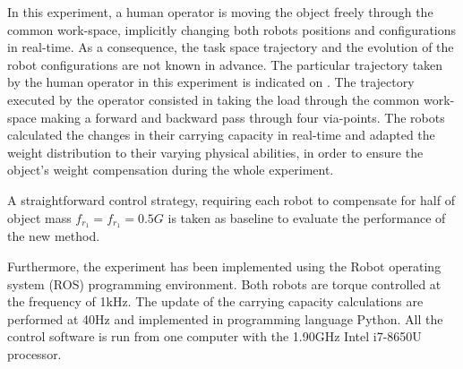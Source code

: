 In this experiment, a human operator is moving the object freely through the common work-space, implicitly changing both robots positions and configurations in real-time. As a consequence, the task space trajectory and the evolution of the robot configurations are not known in advance. The particular trajectory taken by the human operator in this experiment is indicated on . 
The trajectory executed by the operator consisted in taking the load through the common work-space making a forward and backward pass through four via-points. The robots calculated the changes in their carrying capacity in real-time and adapted the weight distribution to their varying physical abilities, in order to ensure the object's weight compensation during the whole experiment.

A straightforward control strategy, requiring each robot to compensate for half of object mass $f_{r_1}=f_{r_1}=0.5G$ is taken as baseline to evaluate the performance of the new method.

Furthermore, the experiment has been implemented using the Robot operating system (ROS) programming environment. Both robots are torque controlled at the frequency of 1kHz. The update of the carrying capacity calculations are performed at 40Hz and implemented in programming language Python. All the control software is run from one computer with the 1.90GHz Intel i7-8650U processor. 

